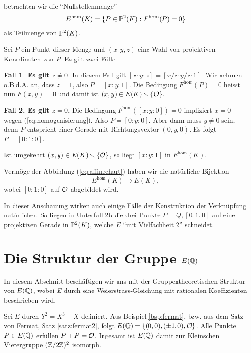 betrachten wir die ``Nullstellenmenge''
\begin{equation*}
  E^{\mathrm{hom}}(K) = \{P \in {\mathbb{P}}^2(K): F^{\mathrm{hom}}(P) = 0\}
\end{equation*}
als Teilmenge von ${\mathbb{P}}^2(K)$.

Sei $P$ ein Punkt dieser Menge und $(x,y,z)$ eine Wahl von projektiven
Koordinaten von $P$. Es gilt zwei Fälle.

\textbf{Fall 1. Es gilt $z\not=0$.} In diesem Fall gilt $[x:y:z] =
[x/z:y/z:1]$. Wir nehmen o.B.d.A. an, dass $z=1$, also $P=[x:y:1]$.
Die Bedingung $F^{\mathrm{hom}}(P)=0$ heisst nun $F(x,y)=0$ und damit
ist $(x,y) \in E(K)\smallsetminus\{{\mathcal O}\}$.

\textbf{Fall 2. Es gilt $z=0$.} Die Bedingung
$F^{\mathrm{hom}}([x:y:0])=0$ impliziert
$x=0$ wegen (\ref{eq:homogenisierung}). Also $P = [0:y:0]$. Aber dann
muss $y\not=0$ sein, denn $P$ entspricht einer Gerade mit
Richtungsvektor $(0,y,0)$. Es folgt $P = [0:1:0]$.

Ist umgekehrt $(x,y)\in E(K)\smallsetminus\{{\mathcal O}\}$, so liegt $[x:y:1]$ in
$E^{\mathrm{hom}}(K)$.


Vermöge der Abbildung (\ref{eq:affinechart}) haben wir die natürliche
Bijektion 
\begin{equation*}
  E^{\mathrm{hom}}(K) \rightarrow E(K),
\end{equation*}
wobei $[0:1:0]$ auf ${\mathcal O}$ abgebildet wird. 

In dieser Anschauung wirken auch einige Fälle der Konstruktion der
Verknüpfung natürlicher. So liegen in  Unterfall 2b die drei Punkte
$P=Q,[0:1:0]$ auf einer projektiven Gerade in ${\mathbb{P}}^2(K)$, welche $E$
``mit Vielfachheit 2'' schneidet. 

\section{Die Struktur der Gruppe $E({\mathbb{Q}})$}

In diesem Abschnitt beschäftigen wir uns mit der Gruppentheoretischen
Struktur von $E({\mathbb{Q}})$, wobei $E$ durch eine Weierstrass-Gleichung mit
rationalen Koeffizienten beschrieben wird. 


\begin{beispiel}
  Sei $E$ durch $Y^2 = X^3-X$ definiert. 
  Aus Beispiel \ref{bsp:fermat}, bzw. aus dem Satz von Fermat, Satz
  \ref{satz:fermat2}, folgt $E({\mathbb{Q}}) = \{(0,0),(\pm 1,0),{\mathcal O}\}$. Alle
  Punkte $P\in E({\mathbb{Q}})$ erfüllen $P+P={\mathcal O}$. Ingesamt ist $E({\mathbb{Q}})$ damit
  zur Kleinschen Vierergruppe $({\mathbb{Z}}/2{\mathbb{Z}})^2$ isomorph. 
\end{beispiel}

